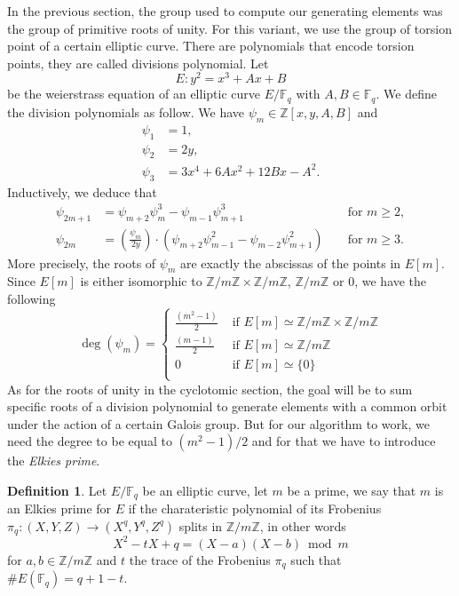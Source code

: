 \documentclass[12pt]{article}
\theoremstyle{plain}
\theoremstyle{definition}
\newtheorem{definition}[theorem]{Definition}
\def\Z{\ensuremath{\mathbb{Z}}}
\def\F{\ensuremath{\mathbb{F}}}
\newcounter{algorithm}
\begin{document}
In the previous section, the group used to compute our generating elements was
the group of primitive roots of unity. For this variant, we use the group of
torsion point of a certain elliptic curve. There are polynomials that encode 
torsion points, they are called divisions polynomial. Let 
\begin{equation}
E : y^2 = x^3 + Ax + B
\end{equation}
be the weierstrass equation of an elliptic curve $E/\F_q$ with $A,B\in\F_q$.
We define the division polynomials as follow. We have $\psi_m\in\Z[x,y,A,B]$ and 
\begin{align*}
\psi_1 &=1,\\
\psi_2 &= 2y,\\
\psi_{3} &= 3x^{4} + 6Ax^{2} + 12Bx - A^{2}.
\end{align*}
Inductively, we deduce that
\begin{align*}
\psi_{2m+1}&=\psi_{m+2}\psi_{m}^{3}-\psi_{m-1}\psi^{3}_{m+1}
&&\text{ for }m\geq2,\\
\psi_{2m}&=\left(\frac{\psi_{m}}{2y}\right)\cdot(
\psi_{m+2}\psi^{2}_{m-1}-\psi_{m-2}\psi^{2}_{m+1})&&\text{ for }m\geq
3.
\end{align*}
More precisely, the roots of $\psi_m$ are exactly the abscissas of the
points in $E[m]$. Since $E[m]$ is either isomorphic to $\Z/m\Z\times\Z/m\Z$,
$\Z/m\Z$ or $0$, we have the following
\begin{equation}
\deg(\psi_m) = \begin{cases}
   \tfrac{(m^2-1)}{2} &\text{ if }E[m]\simeq\Z/m\Z\times\Z/m\Z\\
   \tfrac{(m-1)}{2} &\text{ if }E[m]\simeq\Z/m\Z\\
   0 &\text{ if } E[m]\simeq\lbrace{0}\rbrace\\
\end{cases}
\end{equation}
As for the roots of unity in the cyclotomic section, the goal will be to sum
specific roots of a division polynomial to generate elements with a common orbit
under the action of a certain Galois group. But for our algorithm to work, we need
the degree to be equal to $(m^2 - 1)/2$ and for that we have to introduce the
\emph{Elkies prime}.

\begin{definition}
Let $E/\F_q$ be an elliptic curve, let $m$ be a prime, we say that $m$
is an Elkies prime for $E$ if the charateristic polynomial of its Frobenius
$\pi_q : (X, Y, Z) \to (X^q, Y^q, Z^q)$ splits in $\Z/m\Z$, in other words
\begin{equation}
X^2 - tX + q = (X - a)(X - b) \bmod m
\end{equation}
for $a,b\in\Z/m\Z$ and $t$ the trace of the Frobenius $\pi_q$ such that 
$\# E(\F_q) = q + 1 - t$.
\end{definition}
\end{document}
